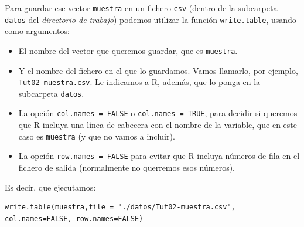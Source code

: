 \documentclass[10pt,a4paper]{article}\usepackage[]{graphicx}\usepackage[]{color}
\begin{document}
Para guardar ese vector {\tt muestra} en un fichero {\tt csv} (dentro de la subcarpeta {\tt datos} del {\em directorio de trabajo}) podemos utilizar la función {\tt write.table}, usando como argumentos:
 \begin{itemize}
   \item El nombre del vector que queremos guardar, que es {\tt muestra}.
   \item Y el nombre del fichero en el que lo guardamos. Vamos llamarlo, por ejemplo, {\tt Tut02-muestra.csv}. Le indicamos a R, además, que lo ponga en la subcarpeta {\tt datos}.
   \item La opción  {\tt col.names = FALSE} o {\tt col.names = TRUE}, para decidir si queremos que R incluya una línea de cabecera con el nombre de la variable, que en este caso es {\tt muestra} (y que no vamos a incluir).
   \item La opción  {\tt row.names = FALSE} para evitar que R incluya números de fila en el fichero de salida (normalmente no querremos esos números).
 \end{itemize}
Es decir, que ejecutamos:
\begin{verbatim}
write.table(muestra,file = "./datos/Tut02-muestra.csv", col.names=FALSE, row.names=FALSE)
\end{verbatim}
\end{document}
